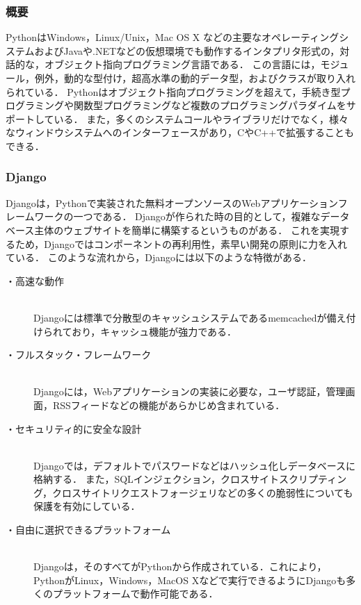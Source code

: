 \subsubsection{概要}
Python\cite{python}はWindows，Linux/Unix，Mac OS X などの主要なオペレーティングシステムおよびJavaや.NETなどの仮想環境でも動作するインタプリタ形式の，対話的な，オブジェクト指向プログラミング言語である．
この言語には，モジュール，例外，動的な型付け，超高水準の動的データ型，およびクラスが取り入れられている．
Pythonはオブジェクト指向プログラミングを超えて，手続き型プログラミングや関数型プログラミングなど複数のプログラミングパラダイムをサポートしている．
また，多くのシステムコールやライブラリだけでなく，様々なウィンドウシステムへのインターフェースがあり，C\cite{Clang}やC++\cite{cplusplus}で拡張することもできる．

\subsubsection{Django}
Django\cite{Django}は，Pythonで実装された無料オープンソースのWebアプリケーションフレームワークの一つである．
Djangoが作られた時の目的として，複雑なデータベース主体のウェブサイトを簡単に構築するというものがある．
これを実現するため，Djangoではコンポーネントの再利用性，素早い開発の原則に力を入れている．
このような流れから，Djangoには以下のような特徴がある．

\begin{description}
    \item[・高速な動作]\mbox{}\\
        Djangoには標準で分散型のキャッシュシステムであるmemcached\cite{memcached}が備え付けられており，キャッシュ機能が強力である．
    \item[・フルスタック・フレームワーク]\mbox{}\\
        Djangoには，Webアプリケーションの実装に必要な，ユーザ認証，管理画面，RSSフィードなどの機能があらかじめ含まれている．
    \item[・セキュリティ的に安全な設計]\mbox{}\\
        Djangoでは，デフォルトでパスワードなどはハッシュ化しデータベースに格納する．
        また，SQLインジェクション，クロスサイトスクリプティング，クロスサイトリクエストフォージェリなどの多くの脆弱性についても保護を有効にしている．
    \item[・自由に選択できるプラットフォーム]\mbox{}\\
        Djangoは，そのすべてがPythonから作成されている．これにより，PythonがLinux，Windows，MacOS Xなどで実行できるようにDjangoも多くのプラットフォームで動作可能である．
\end{description}

